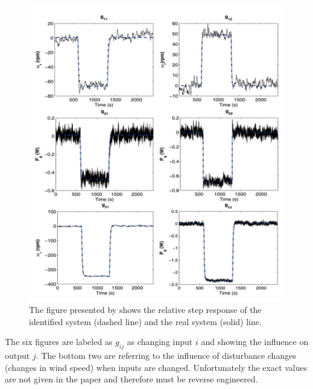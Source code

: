 \begin{figure}[H]
    \center
    \includegraphics[scale=0.5]{fig/Fragoso_et_al_2017_fig6.png}
    \caption{The figure presented by \cite{Fragoso_et_al_2017} shows the relative step response of the identified system (dashed line) and the real system (solid) line.}
    \label{fig:analysis:fig_step_response}
\end{figure}

The six figures are labeled as $g_{ij}$ as changing input $i$ and showing the influence on output $j$.
The bottom two are referring to the influence of disturbance changes (changes in wind speed) when inputs are changed.
Unfortunately the exact values are not given in the paper and therefore must be reverse engineered.

